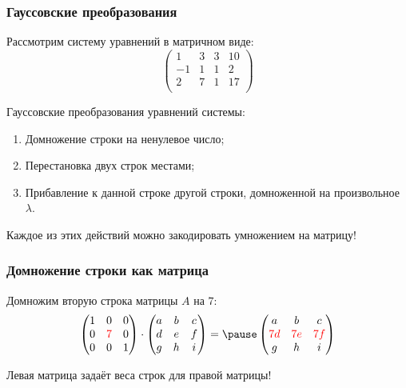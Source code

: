 \begin{frame}
    \frametitle{Гауссовские преобразования}

    Рассмотрим систему уравнений в матричном виде:
    \[
    \left(
    \begin{array}{ccc|c}
    1 & 3 & 3  & 10 \\
    -1 & 1 & 1 & 2 \\
    2 & 7 & 1  & 17 \\
    \end{array}
    \right)
    \]
    \pause

    Гауссовские преобразования уравнений системы:
    
    \begin{enumerate}
        \item Домножение строки на ненулевое число;
        \item Перестановка двух строк местами;
        \item Прибавление к данной строке другой строки, домноженной на произвольное $\lambda$.
    \end{enumerate}
    \pause
    Каждое из этих действий можно закодировать умножением на матрицу!

\end{frame}

\begin{frame}
    \frametitle{Домножение строки как матрица}


    Домножим вторую строка матрицы $A$ на $7$:
    \[
    \begin{pmatrix}
        1 & 0 & 0 \\
        0 & \red{7} & 0 \\
        0 & 0 & 1 \\
    \end{pmatrix}   \cdot 
    \begin{pmatrix}
        a & b & c \\
        d & e & f \\
        g & h & i \\
    \end{pmatrix} =\pause
\begin{pmatrix}
    a & b & c \\
    \red{7d} & \red{7e} & \red{7f} \\
    g & h & i \\
\end{pmatrix}   
    \]


Левая матрица задаёт веса строк для правой матрицы!


\end{frame}



